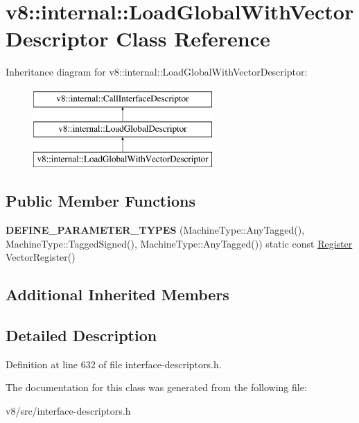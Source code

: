 \hypertarget{classv8_1_1internal_1_1LoadGlobalWithVectorDescriptor}{}\section{v8\+:\+:internal\+:\+:Load\+Global\+With\+Vector\+Descriptor Class Reference}
\label{classv8_1_1internal_1_1LoadGlobalWithVectorDescriptor}
Inheritance diagram for v8\+:\+:internal\+:\+:Load\+Global\+With\+Vector\+Descriptor\+:\begin{figure}[H]
\begin{center}
\leavevmode
\includegraphics[height=3.000000cm]{classv8_1_1internal_1_1LoadGlobalWithVectorDescriptor}
\end{center}
\end{figure}
\subsection*{Public Member Functions}
\begin{DoxyCompactItemize}
\item 
\mbox{\label{classv8_1_1internal_1_1LoadGlobalWithVectorDescriptor_a50cb5485fc41a401fbe47b995895d5e0}} 
{\bfseries D\+E\+F\+I\+N\+E\+\_\+\+P\+A\+R\+A\+M\+E\+T\+E\+R\+\_\+\+T\+Y\+P\+ES} (Machine\+Type\+::\+Any\+Tagged(), Machine\+Type\+::\+Tagged\+Signed(), Machine\+Type\+::\+Any\+Tagged()) static const \mbox{\hyperlink{classv8_1_1internal_1_1Register}{Register}} Vector\+Register()
\end{DoxyCompactItemize}
\subsection*{Additional Inherited Members}


\subsection{Detailed Description}


Definition at line 632 of file interface-\/descriptors.\+h.



The documentation for this class was generated from the following file\+:\begin{DoxyCompactItemize}
\item 
v8/src/interface-\/descriptors.\+h\end{DoxyCompactItemize}
